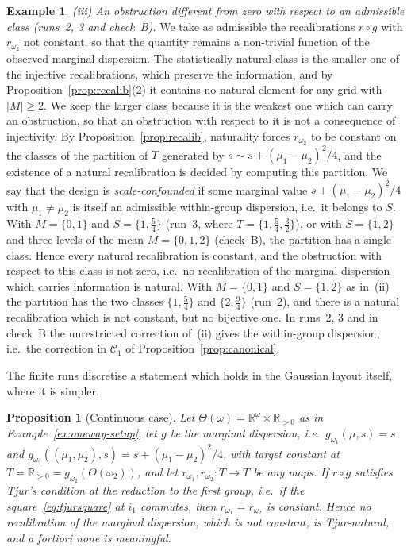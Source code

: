 \documentclass[11pt,a4paper]{article}
\theoremstyle{plain}
\newtheorem{proposition}[theorem]{Proposition}
\theoremstyle{definition}
\newtheorem{example}[theorem]{Example}
\theoremstyle{remark}
\newcommand{\R}{\mathbb{R}}
\begin{document}
\begin{example}
\emph{(iii) An obstruction different from zero with respect to an admissible
class (runs~2, 3 and check~B).} We take as admissible the recalibrations
$r \circ g$ with $r_{\omega_2}$ not constant, so that the quantity remains a
non-trivial function of the observed marginal dispersion. The statistically
natural class is the smaller one of the injective recalibrations, which
preserve the information, and by Proposition~\ref{prop:recalib}(2) it contains
no natural element for any grid with $|M| \ge 2$. We keep the larger class
because it is the weakest one which can carry an obstruction, so that an
obstruction with respect to it is not a consequence of injectivity. By
Proposition~\ref{prop:recalib}, naturality forces $r_{\omega_2}$ to be constant
on the classes of the partition of $T$ generated by
$s \sim s + (\mu_1-\mu_2)^2/4$, and the existence of a natural recalibration is
decided by computing this partition. We say that the design is
\emph{scale-confounded} if some marginal value $s + (\mu_1-\mu_2)^2/4$ with
$\mu_1 \neq \mu_2$ is itself an admissible within-group dispersion, i.e.\ it
belongs to $S$. With $M = \{0,1\}$ and $S = \{1,\tfrac54\}$ (run~3, where
$T = \{1,\tfrac54,\tfrac32\}$), or with $S = \{1,2\}$ and three levels of the
mean $M = \{0,1,2\}$ (check~B), the partition has a single class. Hence every
natural recalibration is constant, and the obstruction with respect to this
class is not zero, i.e.\ no recalibration of the marginal dispersion which
carries information is natural. With $M = \{0,1\}$ and $S = \{1,2\}$ as
in~(ii) the partition has the two classes $\{1,\tfrac54\}$ and
$\{2,\tfrac94\}$ (run~2), and there is a natural recalibration which is not
constant, but no bijective one. In runs~2, 3 and in check~B the unrestricted
correction of~(ii) gives the within-group dispersion, i.e.\ the correction in
$\mathcal{C}_{1}$ of Proposition~\ref{prop:canonical}.
\end{example}

The finite runs discretise a statement which holds in the Gaussian layout
itself, where it is simpler.

\begin{proposition}[Continuous case]\label{prop:oneway-cont-recalib}
Let $\Theta(\omega) = \R^{\omega} \times \R_{>0}$ as in
Example~\ref{ex:oneway-setup}, let $g$ be the marginal dispersion, i.e.\
$g_{\omega_1}(\mu,s) = s$ and
$g_{\omega_2}((\mu_1,\mu_2),s) = s + (\mu_1-\mu_2)^{2}/4$, with target constant
at $T = \R_{>0} = g_{\omega_2}(\Theta(\omega_2))$, and let
$r_{\omega_1}, r_{\omega_2} \colon T \to T$ be any maps. If $r \circ g$
satisfies Tjur's condition at the reduction to the first group, i.e.\ if the
square~\eqref{eq:tjursquare} at $i_1$ commutes, then
$r_{\omega_1} = r_{\omega_2}$ is constant. Hence no recalibration of the
marginal dispersion, which is not constant, is Tjur-natural, and a fortiori none
is meaningful.
\end{proposition}
\end{document}
